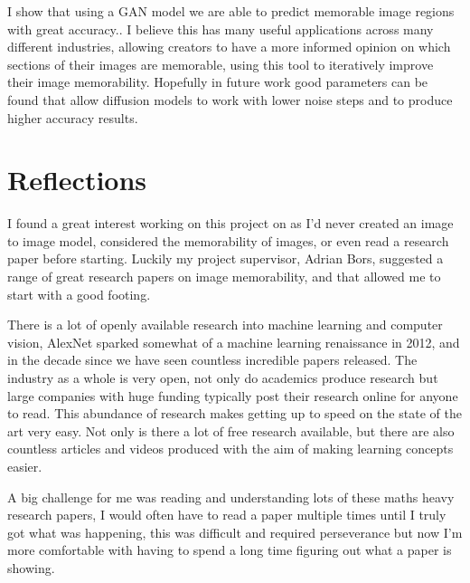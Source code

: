 \documentclass{UoYCSproject}
\begin{document}
I show that using a GAN model we are able to predict memorable image regions with great accuracy.. I believe this has many useful applications across many different industries, allowing creators to have a more informed opinion on which sections of their images are memorable, using this tool to iteratively improve their image memorability. Hopefully in future work good parameters can be found that allow diffusion models to work with lower noise steps and to produce higher accuracy results.

\chapter{Reflections}









I found a great interest working on this project on as I'd never created an image to image model, considered the memorability of images, or even read a research paper before starting. Luckily my project supervisor, Adrian Bors, suggested a range of great research papers on image memorability, and that allowed me to start with a good footing.

There is a lot of openly available research into machine learning and computer vision, AlexNet \cite{alexnet} sparked somewhat of a machine learning renaissance in 2012, and in the decade since we have seen countless incredible papers released. The industry as a whole is very open, not only do academics produce research but large companies with huge funding typically post their research online for anyone to read. This abundance of research makes getting up to speed on the state of the art very easy. Not only is there a lot of free research available, but there are also countless articles and videos produced with the aim of making learning concepts easier. 

A big challenge for me was reading and understanding lots of these maths heavy research papers, I would often have to read a paper multiple times until I truly got what was happening, this was difficult and required perseverance but now I'm more comfortable with having to spend a long time figuring out what a paper is showing.
\end{document}
